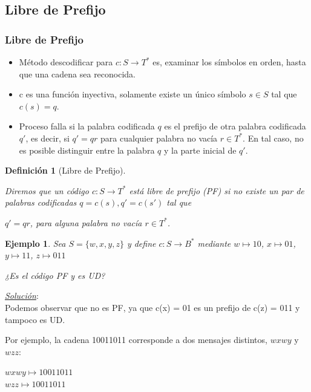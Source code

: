 \documentclass{beamer}
\newtheorem{ejemplo} [Ejemplo] {Ejemplo}
\newtheorem{definicion} [Definicion]{Definición}
\begin{document}
\subsection{Libre de Prefijo}
\begin{frame}\frametitle{Libre de Prefijo}      \small
 
 \begin{itemize}
\item  Método descodificar para $c: S\rightarrow T^{*}$ es, examinar los símbolos en orden, hasta que una cadena sea reconocida. 

\item c es una función inyectiva, solamente existe un único símbolo $s \in S$ tal que  $c(s) = q$. 

\item Proceso falla si la palabra codificada $q$ es el prefijo de otra palabra codificada $q'$, es decir, si $q' = qr$ para cualquier palabra no vacía $r \in T^{*}$. En tal caso, no es posible distinguir entre la palabra $q$ y la parte inicial de $q'$.

\end{itemize}
 
 
\begin{definicion} [Libre de Prefijo]\label{PF}

Diremos que un código $c: S\rightarrow T^{*}$  está libre de prefijo (PF) si no existe un par de palabras codificadas $q = c(s), q' = c(s')$ tal que 

\begin{center}
$q' = qr$,	 para alguna palabra no vacía $r \in T^{*}$.
\end{center}

\end{definicion}

\end{frame}


\begin{frame}      \small
 
\begin{ejemplo}
 
Sea $S=\{w,x,y,z\}$ y define  $c: S\rightarrow B^{*}$ mediante $w \mapsto 10$,  $x\mapsto 01$, $y \mapsto 11$, $z \mapsto 011 $

¿Es el código PF y es UD? 
\end{ejemplo} 

\pause

\textit{\underline{Solución}}:\\
Podemos observar que no es PF, ya que c(x) = 01 es un prefijo de c(z) = 011 y tampoco es UD. 

Por ejemplo, la cadena 10011011 corresponde a dos mensajes distintos, $wxwy$ y $wzz$:\\

\begin{center}
$wxwy \mapsto 10 01 10 11$	\\
$wzz \mapsto 10 011 011$
\end{center}


\end{frame}
\end{document}
